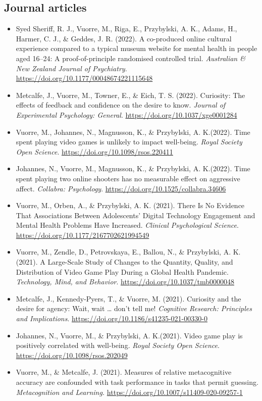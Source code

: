 \documentclass[12pt, a4paper]{article}
\newcommand{\years}[1]{\marginnote{\scriptsize #1}}
\begin{document}
\subsection*{Journal articles}
\begin{itemize}
\item \years{2022} Syed Sheriff, R. J., Vuorre, M., Riga, E., Przybylski, A. K., Adams, H., Harmer, C. J., \& Geddes, J. R. (2022). A co-produced online cultural experience compared to a typical museum website for mental health in people aged 16–24: A proof-of-principle randomised controlled trial. \emph{Australian \& New Zealand Journal of Psychiatry}. \url{https://doi.org/10.1177/00048674221115648}
\item Metcalfe, J., Vuorre, M., Towner, E., \& Eich, T. S. (2022). Curiosity: The effects of feedback and confidence on the desire to know. \emph{Journal of Experimental Psychology: General}. \url{https://doi.org/10.1037/xge0001284}
\item Vuorre, M.\footnotemark[1], Johannes, N.\footnotemark[1], Magnusson, K., \& Przybylski, A. K.\footnotemark[1] (2022). Time spent playing video games is unlikely to impact well-being. \emph{Royal Society Open Science}. \url{https://doi.org/10.1098/rsos.220411}
\item Johannes, N.\footnotemark[1], Vuorre, M.\footnotemark[1], Magnusson, K., \& Przybylski, A. K.\footnotemark[1] (2022). Time spent playing two online shooters has no measurable effect on aggressive affect. \emph{Collabra: Psychology}. \url{https://doi.org/10.1525/collabra.34606}
\item \years{2021} Vuorre, M., Orben, A., \& Przybylski, A. K. (2021). There Is No Evidence That Associations Between Adolescents’ Digital Technology Engagement and Mental Health Problems Have Increased. \emph{Clinical Psychological Science}. \\ \url{https://doi.org/10.1177/2167702621994549}
\item Vuorre, M., Zendle, D., Petrovskaya, E., Ballou, N., \& Przybylski, A. K. (2021). A Large-Scale Study of Changes to the Quantity, Quality, and Distribution of Video Game Play During a Global Health Pandemic. \emph{Technology, Mind, and Behavior}. \url{https://doi.org/10.1037/tmb0000048}
\item Metcalfe, J., Kennedy-Pyers, T., \& Vuorre, M. (2021). Curiosity and the desire for agency: Wait, wait … don’t tell me! \emph{Cognitive Research: Principles and Implications}. \url{https://doi.org/10.1186/s41235-021-00330-0}
\item Johannes, N.\footnotemark[1], Vuorre, M.\footnotemark[1], \& Przybylski, A. K.\footnotemark[1] (2021). Video game play is positively correlated with well-being. \emph{Royal Society Open Science}. \url{https://doi.org/10.1098/rsos.202049}
\item Vuorre, M., \& Metcalfe, J. (2021). Measures of relative metacognitive accuracy are confounded with task performance in tasks that permit guessing. \emph{Metacognition and Learning.} \url{https://doi.org/10.1007/s11409-020-09257-1}


\end{itemize}
\end{document}
